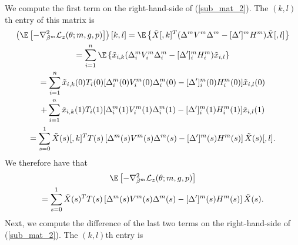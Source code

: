 \documentclass[12pt]{article}
\begin{document}
We compute the first term on the right-hand-side of (\ref{sub_mat_2}). The $(k,l)$th entry of this matrix is
\begin{multline*}
\left( \E\left[-\nabla_{\beta^m}^2 \mathcal{L}_z(\theta; m, g, p)\right]\right)[k,l] = \E \left\{\tilde{X}[,k]^T (\Delta^m V^m \Delta^m - [\Delta']^mH^m) \tilde{X}[,l] \right\} \\ = \sum_{i=1}^n \E \left\{ \tilde{x}_{i,k} (\Delta^m_{i} V^m_{i} \Delta^m_{i} - [\Delta']^m_{i} H^m_{i}) \tilde{x}_{i,l} \right\} \\ = \sum_{i=1}^n \tilde{x}_{i,k}(0) T_i(0) [{\Delta}^m_i(0)  {V}^m_i(0) {\Delta}^m_i(0) - [\Delta']^m_i(0) {H}^m_i(0)] \tilde{x}_{i,l}(0) \\ + \sum_{i=1}^n \tilde{x}_{i,k}(1) T_i(1) [ {\Delta}^m_i(1)  {V}^m_i(1) {\Delta}^m_i(1) - [{\Delta}']^m_i(1) {H}^m_i(1)] \tilde{x}_{i,l}(1) \\ = \sum_{s = 0}^1 \tilde{X}(s)[,k]^T {T}(s) \left[ {\Delta}^m(s) {V}^m(s) {\Delta}^m(s) - [{\Delta}']^m(s) {H}^m(s) \right] \tilde{X}(s)[,l].
\end{multline*}
We therefore have that
\begin{multline*} \E\left[-\nabla_{\beta^m}^2 \mathcal{L}_z(\theta; m, g, p)\right] \\ = \sum_{s=0}^1 \tilde{X}(s)^T T(s) \left[ {\Delta}^m(s) {V}^m(s) {\Delta}^m(s) - [{\Delta}']^m(s) {H}^m(s) \right] \tilde{X}(s).
\end{multline*}
Next, we compute the difference of the last two terms on the right-hand-side of (\ref{sub_mat_2}). The $(k,l)$th entry is
\end{document}

